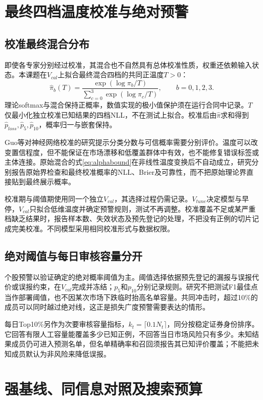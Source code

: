 \section{最终四档温度校准与绝对预警}
\subsection{校准最终混合分布}
即使各专家分别经过校准，其混合也不自然具有总体校准性质，权重还依赖输入状态。本课题在$V_{cal}$上拟合最终混合四档的共同正温度$T>0$：
\begin{equation}
 \widehat\pi_b(T)=\frac{\exp(\log\pi_b/T)}{\sum_{c=0}^{3}\exp(\log\pi_c/T)},\qquad b=0,1,2,3.
 \label{eq:temperature}
\end{equation}
理论softmax与混合保持正概率，数值实现的极小值保护须在运行合同中记录。$T$仅最小化独立校准已知结果的四档NLL，不在测试上拟合。校准后由$\widehat\pi$求和得到$\widehat p_{loss},\widehat p_5,\widehat p_{10}$，概率归一与嵌套保持。

Guo等对神经网络校准的研究提示分类分数与可信概率需要分别评价\cite{r30}。温度可以改变置信程度，但不能保证在市场漂移和低覆盖群体中有效，也不能修复错误标签或主体连接。原始混合的式\eqref{eq:alphabound}在非线性温度变换后不自动成立，研究分别报告原始界检查和最终校准概率的NLL、Brier及可靠性，而不把原始理论界直接贴到最终展示概率。

校准期与阈值期使用同一个独立$V_{cal}$，其选择过程仍需记录。$V_{tune}$决定模型与早停，$V_{cal}$只拟合低维温度并确定预警规则，测试不再调整。校准覆盖不足或某严重档缺乏结果时，报告样本数、失效状态及预先登记的处理，不把没有正例的切片记成完美校准。不同模型采用相同校准形式与数据权限。

\subsection{绝对阈值与每日审核容量分开}
个股预警以验证确定的绝对概率阈值为主。阈值选择依据预先登记的漏报与误报代价或误报约束，在$V_{cal}$完成并冻结；$p_5$和$p_{10}$分别记录规则。研究不把测试F1最佳点当作部署阈值，也不因某次市场下跌临时抬高名单容量。共同冲击时，超过10\%的成员可以同时越过绝对线，这正是损失广度预警需要表达的情形。

每日Top10\%另作为次要审核容量指标，$k_t=\lceil0.1N_t\rceil$，同分按稳定证券身份排序。它回答有限人工容量能覆盖多少已知正例，不回答当日市场风险只有多少。未知结果成员仍可进入预测名单，但名单精确率和召回须报告其已知评价覆盖；不能把未知成员默认为非风险来降低误报。

\section{强基线、同信息对照及搜索预算}
